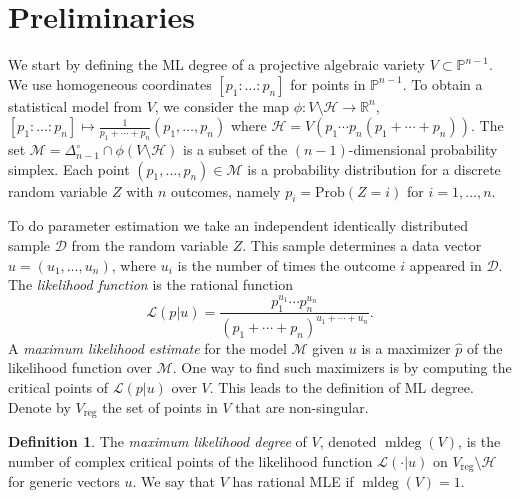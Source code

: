 \documentclass[12pt,reqno]{amsart}   	%
\theoremstyle{plain}
\theoremstyle{definition}
\newtheorem{definition}[theorem]{Definition}
\theoremstyle{remark}
\newcommand{\LL}{\mathcal{L}}
\newcommand{\HH}{\mathcal{H}}
\newcommand{\MM}{\mathcal{M}}
\newcommand{\R}{\mathbb{R}}
\newcommand{\pp}{\mathbb{P}}
\newcommand{\mldeg}{\operatorname{mldeg}}
\begin{document}
\section{Preliminaries}\label{sec:prelim}
We start by defining the ML degree of a projective algebraic variety $V\subset \pp^{n-1}$. We use homogeneous coordinates $[p_1:\ldots:p_n]$ for points in $\pp^{n-1}$.
To obtain a statistical model from $V$, we consider the map $\phi:V\setminus \mathcal{H}\to \R^n$, $[p_1:\ldots:p_n]\mapsto \frac{1}{p_1+\cdots+p_n}(p_1,\ldots,p_n)$ where $\mathcal{H}=V(p_1\cdots p_n(p_1+\cdots+p_n))$. The set $\mathcal{M}=\Delta_{n-1}^{\circ}\cap \phi(V\setminus \HH)$ is a subset of the 
$(n-1)$-dimensional probability simplex. Each point $(p_1,\ldots,p_n)\in \MM$ is a probability distribution for a discrete random variable $Z$ with $n$ outcomes, namely $p_i=\mathrm{Prob}(Z=i)$ for $i=1,\ldots,n$.

To do parameter estimation  we take an independent identically distributed sample $\mathcal{D}$ from the random variable $Z$. This sample determines a data vector $u=(u_1,\ldots,u_n)$, where $u_i$ is the number of times the outcome $i$ appeared in $\mathcal{D}$. The \emph{likelihood function} is the rational function
\[
\LL(p|u)=\frac{p_1^{u_1}\cdots p_n^{u_n}}{(p_1+\cdots+p_n)^{u_1+\cdots+u_n}}.
\]
A \emph{maximum likelihood estimate} for the model $\MM$ given $u$ is a maximizer $\hat{p}$ of the likelihood function over $\mathcal{M}$. One way to find such maximizers is by computing the critical points of $\LL(p|u)$ over $V$. This leads to the definition of ML degree. Denote by $V_{\mathrm{reg}}$ the set of points in $V$ that are non-singular.

\begin{definition}
    The \emph{maximum likelihood degree} of $V$, denoted $\mldeg(V)$, is the
    number of complex critical points of the likelihood function
    $\LL(\cdot|u)$ on $V_{\mathrm{reg}}\setminus \HH$ for generic vectors $u$. We say that $V$ has rational MLE if $\mldeg(V)=1$.
\end{definition}
\end{document}
